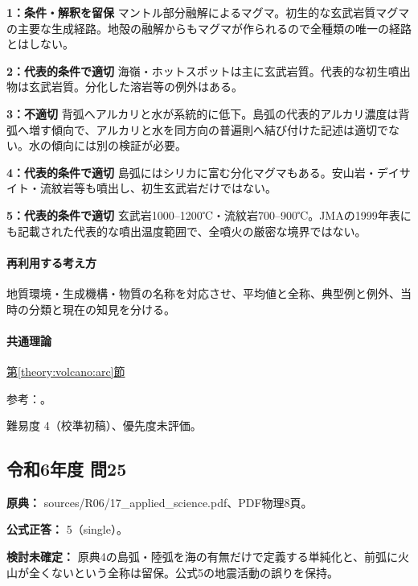 \noindent\textbf{1：条件・解釈を留保} マントル部分融解によるマグマ。初生的な玄武岩質マグマの主要な生成経路。地殻の融解からもマグマが作られるので全種類の唯一の経路とはしない。\par

\noindent\textbf{2：代表的条件で適切} 海嶺・ホットスポットは主に玄武岩質。代表的な初生噴出物は玄武岩質。分化した溶岩等の例外はある。\par

\noindent\textbf{3：不適切} 背弧へアルカリと水が系統的に低下。島弧の代表的アルカリ濃度は背弧へ増す傾向で、アルカリと水を同方向の普遍則へ結び付けた記述は適切でない。水の傾向には別の検証が必要。\par

\noindent\textbf{4：代表的条件で適切} 島弧にはシリカに富む分化マグマもある。安山岩・デイサイト・流紋岩等も噴出し、初生玄武岩だけではない。\par

\noindent\textbf{5：代表的条件で適切} 玄武岩1000–1200℃・流紋岩700–900℃。JMAの1999年表にも記載された代表的な噴出温度範囲で、全噴火の厳密な境界ではない。\par

\paragraph{再利用する考え方} 地質環境・生成機構・物質の名称を対応させ、平均値と全称、典型例と例外、当時の分類と現在の知見を分ける。

\paragraph{共通理論} \hyperref[theory:volcano:arc]{第\ref*{theory:volcano:arc}節}

\par 参考：\cite{vol50_melt_ref,jma_magma1999,vol50_arcwater_ref}。

\par 難易度 4（校準初稿）、優先度未評価。

\subsection{令和6年度 問25}
\label{q:r06-reg-applied-25}

\noindent\textbf{原典：} sources/R06/17\_applied\_science.pdf、PDF物理8頁。

\textbf{公式正答：} 5（single）。

\par\textbf{検討未確定：} 原典4の島弧・陸弧を海の有無だけで定義する単純化と、前弧に火山が全くないという全称は留保。公式5の地震活動の誤りを保持。

